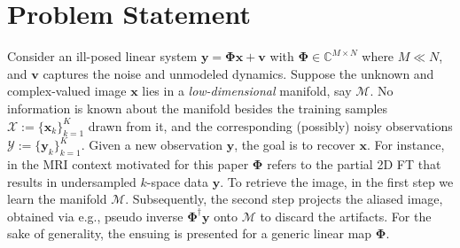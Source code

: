 \documentclass{journal}
\def \cM {\mathcal{M}}
\def \cX {\mathcal{X}}
\def \bPhi {\boldsymbol{\Phi}}
\def \by {\mathbf{y}}
\def \bx {\mathbf{x}}
\def \bv {\mathbf{v}}
\begin{document}
















 















\section{Problem Statement}
\label{sec:problem_statement}
%
Consider an ill-posed linear system $\by=\bPhi \bx + \bv$ with $\bPhi \in \mathbb{C}^{M \times N}$ where $M \ll N$, and $\bv$ captures the noise and unmodeled dynamics. Suppose the unknown and complex-valued image $\bx$ lies in a {\it low-dimensional} manifold, say $\cM$. No information is known about the manifold besides the training samples $\cX:=\{\bx_k\}_{k=1}^K$ drawn from it, and the corresponding (possibly) noisy observations $\mathcal{Y}:=\{\by_k\}_{k=1}^K$. Given a new observation $\by$, the goal is to recover $\bx$. For instance, in the MRI context motivated for this paper $\bPhi$ refers to the partial 2D FT that results in undersampled $k$-space data $\by$. To retrieve the image, in the first step we learn the manifold $\cM$. Subsequently, the second step projects the aliased image, obtained via e.g., pseudo inverse $\bPhi^{\dagger}\by$ onto $\cM$ to discard the artifacts. For the sake of generality, the ensuing is presented for a generic linear map $\bPhi$.
 
\end{document}
